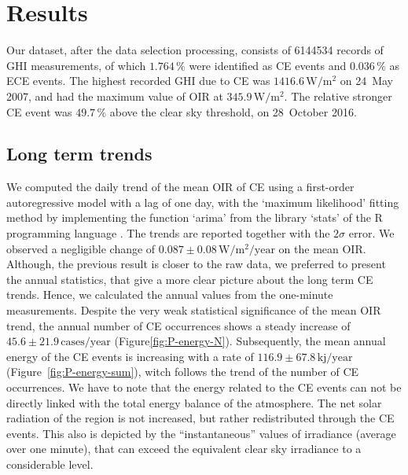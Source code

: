 \documentclass[preprint, 5p,
authoryear]{elsarticle} %
\begin{document}
\hypertarget{results}{%
\section{Results}\label{results}}

Our dataset, after the data selection processing, consists of 6144534
records of GHI measurements, of which \(1.764\,\%\) were identified as
CE events and \(0.036\,\%\) as ECE events. The highest recorded GHI due
to CE was \(1416.6\,\text{W}/\text{m}^2\) on 24~May 2007, and had the
maximum value of OIR at \(345.9\,\text{W}/\text{m}^2\). The relative
stronger CE event was \(49.7\,\%\) above the clear sky threshold, on
28~October 2016.

\hypertarget{long-term-trends}{%
\subsection{Long term trends}\label{long-term-trends}}

We computed the daily trend of the mean OIR of CE using a first-order
autoregressive model with a lag of one day, with the `maximum
likelihood' fitting method \citep{Gardner1980, Jones1980} by
implementing the function `arima' from the library `stats' of the R
programming language \citep{RCT2023}. The trends are reported together
with the \(2\sigma\) error. We observed a negligible change of
\(0.087\pm 0.08\,\text{W}/\text{m}^2/\text{year}\) on the mean OIR.
Although, the previous result is closer to the raw data, we preferred to
present the annual statistics, that give a more clear picture about the
long term CE trends. Hence, we calculated the annual values from the
one-minute measurements. Despite the very weak statistical significance
of the mean OIR trend, the annual number of CE occurrences shows a
steady increase of \(45.6\pm 21.9\,\text{cases}/\text{year}\)
(Figure\nobreakspace{}\ref{fig:P-energy-N}). Subsequently, the mean
annual energy of the CE events is increasing with a rate of
\(116.9\pm 67.8\,\text{kj}/\text{year}\)
(Figure~\ref{fig:P-energy-sum}), witch follows the trend of the number
of CE occurrences. We have to note that the energy related to the CE
events can not be directly linked with the total energy balance of the
atmosphere. The net solar radiation of the region is not increased, but
rather redistributed through the CE events. This also is depicted by the
``instantaneous'' values of irradiance (average over one minute), that
can exceed the equivalent clear sky irradiance to a considerable level.
\end{document}
